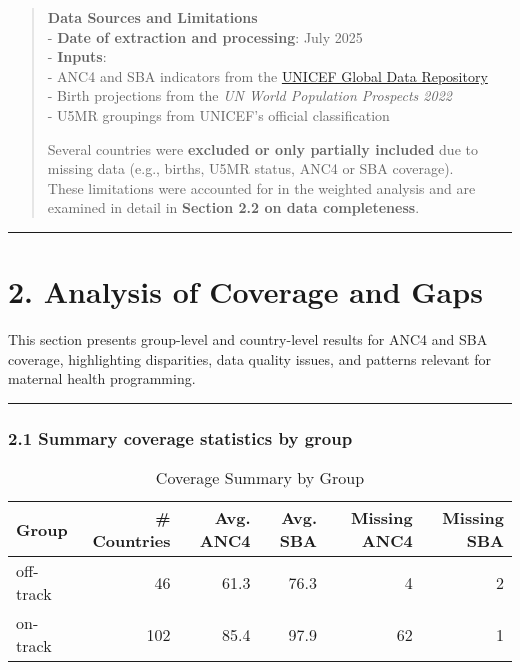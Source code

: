 \documentclass[
]{article}
\begin{document}
\begin{quote}
\textbf{Data Sources and Limitations}\\
- \textbf{Date of extraction and processing}: July 2025\\
- \textbf{Inputs}:\\
- ANC4 and SBA indicators from the
\href{https://data.unicef.org/resources/data_explorer/unicef_f/?ag=UNICEF&df=GLOBAL_DATAFLOW&ver=1.0&dq=.MNCH_ANC4+MNCH_SAB.&startPeriod=2018&endPeriod=2022}{UNICEF
Global Data Repository}\\
- Birth projections from the \emph{UN World Population Prospects 2022}\\
- U5MR groupings from UNICEF's official classification

Several countries were \textbf{excluded or only partially included} due
to missing data (e.g., births, U5MR status, ANC4 or SBA coverage).\\
These limitations were accounted for in the weighted analysis and are
examined in detail in \textbf{Section 2.2 on data completeness}.
\end{quote}

\begin{center}\rule{0.5\linewidth}{0.5pt}\end{center}

\section{2. Analysis of Coverage and
Gaps}\label{analysis-of-coverage-and-gaps}

This section presents group-level and country-level results for ANC4 and
SBA coverage, highlighting disparities, data quality issues, and
patterns relevant for maternal health programming.

\begin{center}\rule{0.5\linewidth}{0.5pt}\end{center}

\subsubsection{2.1 Summary coverage statistics by
group}\label{summary-coverage-statistics-by-group}

\begin{longtable}[t]{lrrrrr}
\caption{\label{tab:unnamed-chunk-1}Coverage Summary by Group}\\
\toprule
Group & \# Countries & Avg. ANC4 & Avg. SBA & Missing ANC4 & Missing SBA\\
\midrule
off-track & 46 & 61.3 & 76.3 & 4 & 2\\
on-track & 102 & 85.4 & 97.9 & 62 & 1\\
\bottomrule
\end{longtable}
\end{document}
